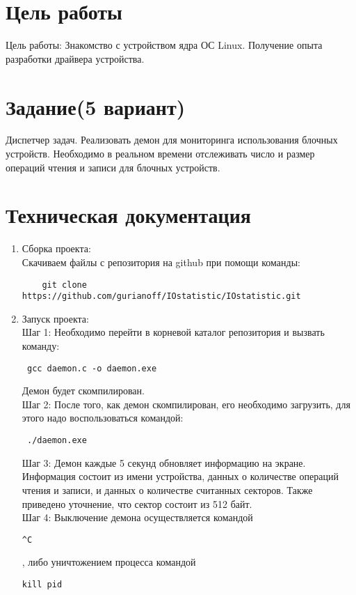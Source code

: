 \documentclass[a4paper]{article}
\begin{document}
\newpage

\section{Цель работы}

\normalsize Цель работы: Знакомство с устройством ядра ОС Linux.
Получение опыта разработки драйвера устройства.

\section{Задание(5 вариант)}

Диспетчер задач. Реализовать демон для мониторинга использования
блочных устройств. Необходимо в реальном времени отслеживать число 
и размер операций чтения и записи для блочных устройств.

\section{Техническая документация}
\begin{enumerate}
	\item Сборка проекта: \\
		Скачиваем файлы с репозитория на github при помощи команды: \begin{verbatim}
	git clone https://github.com/gurianoff/IOstatistic/IOstatistic.git
\end{verbatim} 
	\item Запуск проекта: \\
	Шаг 1: Необходимо перейти в корневой каталог репозитория и вызвать команду: \begin{verbatim} gcc daemon.c -o daemon.exe
\end{verbatim}  Демон будет скомпилирован.
	 \\
	Шаг 2: После того, как демон скомпилирован, его необходимо загрузить,
		для этого надо воспользоваться командой: \begin{verbatim} ./daemon.exe 
\end{verbatim}
	Шаг 3: Демон каждые 5 секунд обновляет информацию на экране. 
		Информация состоит из имени устройства, данных о количестве 
		операций чтения и записи, и данных о количестве считанных 
		секторов. Также приведено уточнение, что сектор состоит из 512 байт.
	 \\
	Шаг 4: Выключение демона осуществляется командой \begin{verbatim}^C\end{verbatim}, либо уничтожением процесса командой  \begin{verbatim}kill pid\end{verbatim}
\end{enumerate}
\newpage
\end{document}
